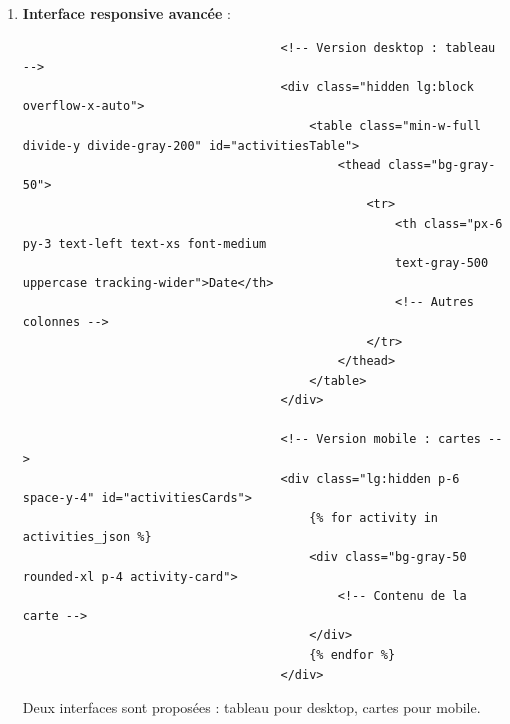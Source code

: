 \documentclass[a4paper,11pt]{article}
\begin{document}
\begin{enumerate}
                        \item \textbf{Interface responsive avancée} :
                            \begin{tcolorbox}[colback=lightgray!5, colframe=gray!80, left=-70mm, right=5mm, top=2mm, bottom=0mm, boxrule=0.1mm]
                                \begin{verbatim}
                                    <!-- Version desktop : tableau -->
                                    <div class="hidden lg:block overflow-x-auto">
                                        <table class="min-w-full divide-y divide-gray-200" id="activitiesTable">
                                            <thead class="bg-gray-50">
                                                <tr>
                                                    <th class="px-6 py-3 text-left text-xs font-medium 
                                                    text-gray-500 uppercase tracking-wider">Date</th>
                                                    <!-- Autres colonnes -->
                                                </tr>
                                            </thead>
                                        </table>
                                    </div>

                                    <!-- Version mobile : cartes -->
                                    <div class="lg:hidden p-6 space-y-4" id="activitiesCards">
                                        {% for activity in activities_json %}
                                        <div class="bg-gray-50 rounded-xl p-4 activity-card">
                                            <!-- Contenu de la carte -->
                                        </div>
                                        {% endfor %}
                                    </div>
                                \end{verbatim}
                            \end{tcolorbox}

                            \noindent Deux interfaces sont proposées : tableau pour desktop, cartes pour mobile.


\end{enumerate}
\end{document}

